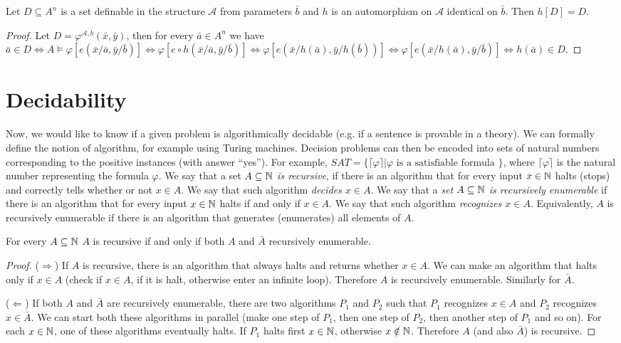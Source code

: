 \begin{lemma}
Let $D \subseteq A^n$ is a set definable in the structure $\mathcal{A}$ from parameters $\bar{b}$ and $h$ is an automorphism on $\mathcal{A}$ identical on $\bar{b}$. Then $h[D] = D$.
\end{lemma}
\begin{proof}
Let $D = \varphi^{\mathcal{A}, \bar{b}}(\bar{x}, \bar{y})$, then for every $\bar{a} \in A^n$ we have $\bar{a} \in D \Leftrightarrow A \vDash \varphi[e(\bar{x}/\bar{a}, \bar{y}/\bar{b})] \Leftrightarrow \varphi[e \circ h(\bar{x}/\bar{a}, \bar{y}/\bar{b})] \Leftrightarrow \varphi[e(\bar{x}/h(\bar{a}), \bar{y}/h(\bar{b}))] \Leftrightarrow \varphi[e(\bar{x}/h(\bar{a}), \bar{y}/\bar{b})] \Leftrightarrow h(\bar{a}) \in D$.
\end{proof}

\section{Decidability}

Now, we would like to know if a given problem is algorithmically decidable (e.g. if a sentence is provable in a theory). We can formally define the notion of algorithm, for example using Turing machines. Decision problems can then be encoded into sets of natural numbers corresponding to the positive instances (with answer ``yes''). For example, $SAT = \{\lceil \varphi \rceil | \varphi \text{ is a satisfiable formula }\}$, where $\lceil \varphi \rceil$ is the natural number representing the formula $\varphi$. We say that a set \emph{$A \subseteq \mathbb{N}$ is recursive}, if there is an algorithm that for every input $x \in \mathbb{N}$ halts (stops) and correctly tells whether or not $x \in A$. We say that such algorithm \emph{decides $x \in A$}. We say that a \emph{set $A \subseteq \mathbb{N}$ is recursively enumerable} if there is an algorithm that for every input $x \in \mathbb{N}$ halts if and only if $x \in A$. We say that such algorithm \emph{recognizes $x \in A$}. Equivalently, $A$ is recursively enumerable if there is an algorithm that generates (enumerates) all elements of $A$. 

\begin{lemma}
For every $A \subseteq \mathbb{N}$ $A$ is recursive if and only if both $A$ and $\bar{A}$ recursively enumerable.
\end{lemma}
\begin{proof}
($\Rightarrow$) If $A$ is recursive, there is an algorithm that always halts and returns whether $x \in A$. We can make an algorithm that halts only if $x \in A$ (check if $x \in A$, if it is halt, otherwise enter an infinite loop). Therefore $A$ is recursively enumerable. Similarly for $\bar{A}$. 

($\Leftarrow$) If both $A$ and $\bar{A}$ are recursively enumerable, there are two algorithms $P_1$ and $P_2$ such that $P_1$ recognizes $x \in A$ and $P_2$ recognizes $x \in \bar{A}$. We can start both these algorithms in parallel (make one step of $P_1$, then one step of $P_2$, then another step of $P_1$ and so on). For each $x \in \mathbb{N}$, one of these algorithms eventually halts. If $P_1$ halts first $x \in \mathbb{N}$, otherwise $x \notin \mathbb{N}$. Therefore $A$ (and also $\bar{A}$) is recursive.
\end{proof}


